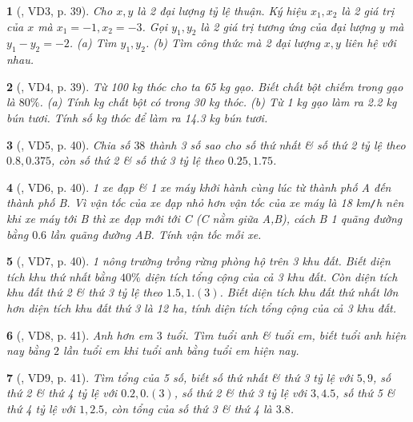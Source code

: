 \documentclass{article}
\newtheorem{baitoan}{}
\begin{document}
\begin{baitoan}[\cite{Binh_boi_duong_Toan_7_tap_1}, VD3, p. 39]
	Cho $x,y$ là 2 đại lượng tỷ lệ thuận. Ký hiệu $x_1,x_2$ là 2 giá trị của $x$ mà $x_1 = -1,x_2 = -3$. Gọi $y_1,y_2$ là 2 giá trị tương ứng của đại lượng $y$ mà $y_1 - y_2 = -2$. (a) Tìm $y_1,y_2$. (b) Tìm công thức mà 2 đại lượng $x,y$ liên hệ với nhau.
\end{baitoan}

\begin{baitoan}[\cite{Binh_boi_duong_Toan_7_tap_1}, VD4, p. 39]
	Từ {\rm100 kg} thóc cho ta {\rm65 kg} gạo. Biết chất bột chiếm trong gạo là $80\%$. (a) Tính {\rm kg} chất bột có trong {\rm30 kg} thóc. (b) Từ {\rm1 kg} gạo làm ra {\rm2.2 kg} bún tươi. Tính số {\rm kg} thóc để làm ra {\rm14.3 kg} bún tươi.
\end{baitoan}

\begin{baitoan}[\cite{Binh_boi_duong_Toan_7_tap_1}, VD5, p. 40]
	Chia số $38$ thành 3 số sao cho số thứ nhất \& số thứ 2 tỷ lệ theo $0.8,0.375$, còn số thứ 2 \& số thứ 3 tỷ lệ theo $0.25,1.75$.
\end{baitoan}

\begin{baitoan}[\cite{Binh_boi_duong_Toan_7_tap_1}, VD6, p. 40]
	1 xe đạp \& 1 xe máy khởi hành cùng lúc từ thành phố A đến thành phố B. Vì vận tốc của xe đạp nhỏ hơn vận tốc của xe máy là {\rm18 km{\tt/}h} nên khi xe máy tới B thì xe đạp mới tới C (C nằm giữa A,B), cách B 1 quãng đường bằng $0.6$ lần quãng đường AB. Tính vận tốc mỗi xe.
\end{baitoan}

\begin{baitoan}[\cite{Binh_boi_duong_Toan_7_tap_1}, VD7, p. 40]
	1 nông trường trồng rừng phòng hộ trên 3 khu đất. Biết diện tích khu thứ nhất bằng $40\%$ diện tích tổng cộng của cả 3 khu đất. Còn diện tích khu đất thứ 2 \& thứ 3 tỷ lệ theo $1.5,1.(3)$. Biết diện tích khu đất thứ nhất lớn hơn diện tích khu đất thứ 3 là {\rm12 ha}, tính diện tích tổng cộng của cả 3 khu đất.
\end{baitoan}

\begin{baitoan}[\cite{Binh_boi_duong_Toan_7_tap_1}, VD8, p. 41]
	Anh hơn em $3$ tuổi. Tìm tuổi anh \& tuổi em, biết tuổi anh hiện nay bằng $2$ lần tuổi em khi tuổi anh bằng tuổi em hiện nay.
\end{baitoan}

\begin{baitoan}[\cite{Binh_boi_duong_Toan_7_tap_1}, VD9, p. 41]
	Tìm tổng của 5 số, biết số thứ nhất \& thứ 3 tỷ lệ với $5,9$, số thứ 2 \& thứ 4 tỷ lệ với $0.2,0.(3)$, số thứ 2 \& thứ 3 tỷ lệ với $3,4.5$, số thứ 5 \& thứ 4 tỷ lệ với $1,2.5$, còn tổng của số thứ 3 \& thứ 4 là $3.8$.
\end{baitoan}
\end{document}
